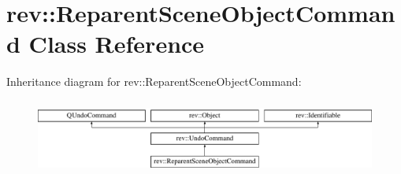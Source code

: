 \hypertarget{classrev_1_1_reparent_scene_object_command}{}\section{rev\+::Reparent\+Scene\+Object\+Command Class Reference}
\label{classrev_1_1_reparent_scene_object_command}
Inheritance diagram for rev\+::Reparent\+Scene\+Object\+Command\+:\begin{figure}[H]
\begin{center}
\leavevmode
\includegraphics[height=2.500000cm]{classrev_1_1_reparent_scene_object_command}
\end{center}
\end{figure}
